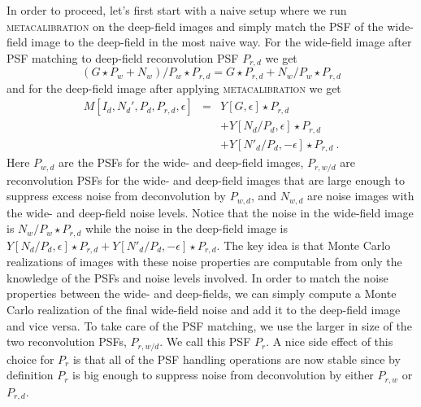 \documentclass[twocolumn]{openjournal}
\makeatletter
\newcommand{\mcal}{\textsc{metacalibration}\@\xspace}
\makeatother
\begin{document}
In order to proceed, let's first start with a naive setup where we run \mcal on the
deep-field images and simply match the PSF of the wide-field image to the deep-field in
the most naive way. For the wide-field image after PSF matching to deep-field
reconvolution PSF $P_{r,d}$ we get
\begin{equation*}
  \left(G\star P_{w} + N_{w}\right)/P_{w} \star P_{r,d} = G \star P_{r,d} + N_{w}/P_{w} \star P_{r,d}
\end{equation*}
and for the deep-field image after applying \mcal we get
\begin{eqnarray}
M[I_{d}, N_{d}', P_{d}, P_{r,d}, \epsilon] & = & Y[G, \epsilon] \star P_{r,d} \nonumber \\
  & & + Y[N_{d}/P_{d}, \epsilon] \star P_{r,d} \nonumber \\
  & & + Y[N'_d/P_d, -\epsilon] \star P_{r,d} \nonumber\ .
\end{eqnarray}
Here $P_{w,d}$ are the PSFs for the wide- and deep-field images, $P_{r,w/d}$ are
reconvolution PSFs for the wide- and deep-field images that are large enough to suppress
excess noise from deconvolution by $P_{w,d}$, and $N_{w,d}$ are noise images with the
wide- and deep-field noise levels. Notice that the noise in the wide-field image is
$N_{w}/P_{w} \star P_{r,d}$ while the noise in the deep-field image is $Y[N_{d}/P_{d},
\epsilon] \star P_{r,d} + Y[N'_d/P_d, -\epsilon] \star P_{r,d}$. The key idea is that
Monte Carlo realizations of images with these noise properties are computable from only
the knowledge of the PSFs and noise levels involved. In order to match
the noise properties between the wide- and deep-fields, we can simply compute a Monte
Carlo realization of the final wide-field noise and add it to the deep-field image and
vice versa. To take care of the PSF matching, we use the larger in size of the two
reconvolution PSFs, $P_{r,w/d}$. We call this PSF $P_{r}$. A nice side effect of this
choice for $P_{r}$ is that all of the PSF handling operations are now stable since by
definition $P_{r}$ is big enough to suppress noise from deconvolution by either
$P_{r,w}$ or $P_{r,d}$.
\end{document}
